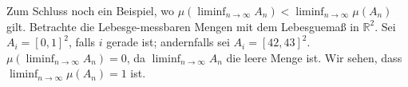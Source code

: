 \documentclass{article}
\begin{document}
Zum Schluss noch ein Beispiel, wo $\mu (\liminf_{n \to \infty} A_n) < \liminf_{n \to \infty} \mu(A_n)$ gilt. Betrachte die Lebesge-messbaren Mengen mit dem Lebesguemaß in $\mathbb R^2$. Sei $A_i = [0,1]^2$, falls $i$ gerade ist; andernfalls sei $A_i = [42,43]^2$. $\mu (\liminf_{n \to \infty} A_n) = 0$, da $\liminf_{n \to \infty} A_n$ die leere Menge ist. Wir sehen, dass $\liminf_{n \to \infty} \mu(A_n) = 1$ ist.
\end{document}
